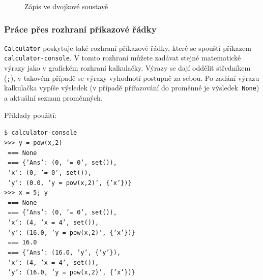 \documentclass[a4paper, 11pt]{article}
\begin{document}
\begin{figure}[H]
    \centering
    \caption{Zápis ve dvojkové soustavě}
\end{figure}

\subsubsection{Práce přes rozhraní příkazové řádky}
\texttt{Calculator} poskytuje také rozhraní příkazové řádky, které se spouští příkazem\texttt{ calculator-console}.
V tomto rozhraní můžete zadávat stejné matematické výrazy jako v grafickém rozhraní kalkulačky. Výrazy se dají oddělit středníkem (\texttt{;}), v takovém případě se výrazy vyhodnotí postupně za sebou. Po zadání výrazu kalkulačka vypíše výsledek (v případě přiřazování do proměnné je výsledek\texttt{ None}) a aktuální seznam proměnných.
\vspace{0.5cm}

\noindent
Příklady použití:

\noindent\texttt{\$ calculator-console} \\
\texttt{>>> y = pow(x,2)} \\
\texttt{\-\ === None} \\
\texttt{\-\ === \{'Ans': (0, '= 0', set()),} \\
\texttt{\-\ 'x': (0, '= 0', set()),} \\
\texttt{\-\ 'y': (0.0, 'y = pow(x,2)', \{'x'\})\}} \\[0.5cm]
\texttt{>>> x = 5; y} \\
\texttt{\-\ === None} \\
\texttt{\-\ === \{'Ans': (0, '= 0', set()),} \\
\texttt{\-\ 'x': (4, 'x = 4', set()),} \\
\texttt{\-\ 'y': (16.0, 'y = pow(x,2)', \{'x'\})\}} \\[0.5cm]
\texttt{\-\ === 16.0} \\
\texttt{\-\ === \{'Ans': (16.0, 'y', \{'y'\}),} \\
\texttt{\-\ 'x': (4, 'x = 4', set()),} \\
\texttt{\-\ 'y': (16.0, 'y = pow(x,2)', \{'x'\})\}}
\end{document}
